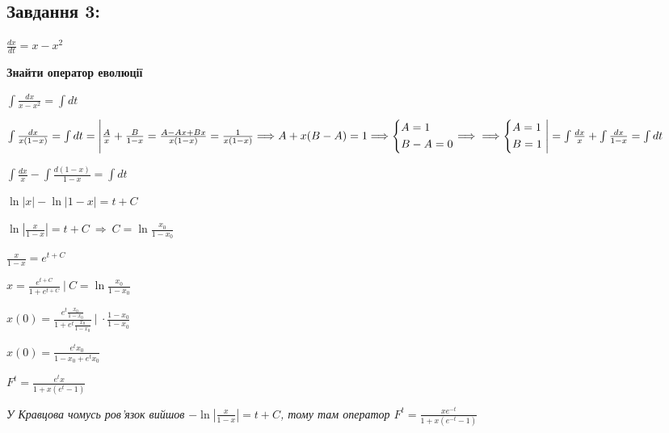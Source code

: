 \subsection{Завдання 3:}

$\frac{dx}{dt} = x - x^2$

\textbf{Знайти оператор еволюції}

$\int \frac{dx}{x - x^2} = \int dt$
\label{pr2:tsk3}

$\int \frac{dx}{x(1-x)} = \int dt = \Bigg{|}\frac{A}{x} + \frac{B}{1-x} = \frac{A - Ax + Bx}{x(1-x)} = \frac{1}{x(1-x)}
\Longrightarrow A +x(B-A) = 1\Longrightarrow \left\{\begin{aligned}
    &A = 1\\
    &B-A = 0
\end{aligned}\right. \Longrightarrow \\\Longrightarrow \left\{\begin{aligned}
    &A = 1\\
    &B = 1
\end{aligned}\right. \Bigg{|} = \int \frac{dx}{x} + \int \frac{dx}{1-x} = \int dt$

$\int \frac{dx}{x} - \int \frac{d(1-x)}{1-x} = \int dt$

$\ln|x| - \ln |1-x| = t +C$

$\ln |\frac{x}{1-x}| = t + C \ \Longrightarrow\ C = \ln \frac{x_0}{1-x_0}$

$\frac{x}{1-x} = e^{t+C}$

$x = \frac{e^{t+C}}{1+e^{t +C}} \ | \ C = \ln \frac{x_0}{1-x_0}$

$x(0) = \frac{e^t\frac{x_0}{1-x_0}}{1+e^t\frac{x_0}{1-x_0}} \ |\ \cdot \frac{1-x_0}{1-x_0}$

$x(0) = \frac{e^tx_0}{1-x_0 + e^tx_0}$

$F^t = \frac{e^tx}{1+x(e^t- 1)}$

\textit{У Кравцова чомусь ров'язок вийшов $-\ln |\frac{x}{1-x}| = t +C$, тому там оператор 
$F^t = \frac{xe^{-t}}{1+x(e^{-t} - 1 )}$}